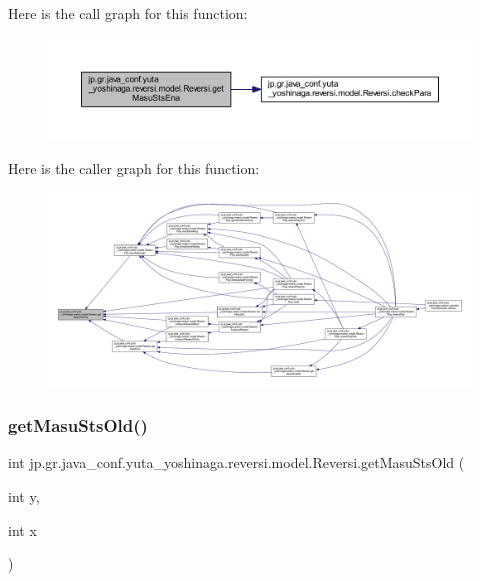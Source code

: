 Here is the call graph for this function\+:
\nopagebreak
\begin{figure}[H]
\begin{center}
\leavevmode
\includegraphics[width=350pt]{classjp_1_1gr_1_1java__conf_1_1yuta__yoshinaga_1_1reversi_1_1model_1_1_reversi_a055f20327e781b1f6807dba0baa1e51b_cgraph}
\end{center}
\end{figure}
Here is the caller graph for this function\+:
\nopagebreak
\begin{figure}[H]
\begin{center}
\leavevmode
\includegraphics[width=350pt]{classjp_1_1gr_1_1java__conf_1_1yuta__yoshinaga_1_1reversi_1_1model_1_1_reversi_a055f20327e781b1f6807dba0baa1e51b_icgraph}
\end{center}
\end{figure}
\mbox{\label{classjp_1_1gr_1_1java__conf_1_1yuta__yoshinaga_1_1reversi_1_1model_1_1_reversi_a051aca9eb7ac3ce375a6c017fd0eb400}} 
\subsubsection{\texorpdfstring{get\+Masu\+Sts\+Old()}{getMasuStsOld()}}
{\footnotesize\ttfamily int jp.\+gr.\+java\+\_\+conf.\+yuta\+\_\+yoshinaga.\+reversi.\+model.\+Reversi.\+get\+Masu\+Sts\+Old (\begin{DoxyParamCaption}\item[{int}]{y,  }\item[{int}]{x }\end{DoxyParamCaption})}



